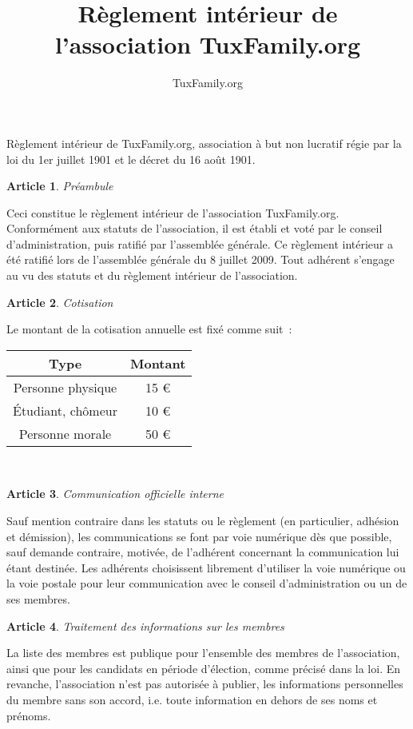 \documentclass[a4paper,twoside]{article}
\title{Règlement intérieur de l'association TuxFamily.org}
\author{TuxFamily.org}
\theoremstyle{plain}
\newtheorem{Art}{Article}
\begin{document}
Règlement intérieur de TuxFamily.org, association à but non lucratif régie par la loi
du 1er juillet 1901 et le décret du 16 août 1901.

\begin{Art}Préambule\end{Art} 

Ceci   constitue  le   règlement  intérieur   de   l'association  TuxFamily.org.
Conformément aux statuts de l'association, il  est établi et voté par le conseil
d'administration, puis ratifié par  l'assemblée générale. Ce règlement intérieur
a été  ratifié lors  de l'assemblée  générale du 8  juillet 2009.  Tout adhérent
s'engage au vu des statuts et du règlement intérieur de l'association.

\begin{Art}Cotisation\end{Art}

Le montant de la cotisation annuelle est fixé comme suit~:\\

\begin{tabular}{|c|c|}
\hline
Type & Montant\\
\hline
Personne physique & 15 \euro\\
Étudiant, chômeur & 10 \euro\\
Personne morale & 50 \euro\\
\hline
\end{tabular}
~\\

\begin{Art}Communication officielle interne\end{Art}

Sauf  mention  contraire dans  les  statuts  ou  le règlement  (en  particulier,
adhésion et  démission), les communications se  font par voie  numérique dès que
possible,  sauf   demande  contraire,  motivée,  de   l'adhérent  concernant  la
communication lui étant destinée. Les adhérents choisissent librement d'utiliser
la voie  numérique ou la  voie postale pour  leur communication avec  le conseil
d'administration ou un de ses membres.

\begin{Art}Traitement des informations sur les membres\end{Art}

La liste des membres est  publique pour l'ensemble des membres de l'association,
ainsi que pour  les candidats en période d'élection, comme  précisé dans la loi.
En  revanche, l'association  n'est  pas autorisée  à  publier, les  informations
personnelles du membre sans son accord,  i.e. toute information en dehors de ses
noms et prénoms.\\
\end{document}
